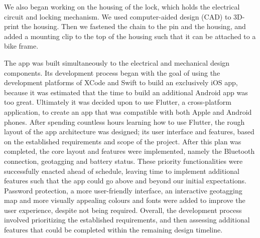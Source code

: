 \documentclass{article}
\begin{document}
We also began working on the housing of the lock, which holds the electrical circuit and locking mechanism. We used computer-aided design (CAD) to 3D-print the housing. Then we fastened the chain to the pin and the housing, and added a mounting clip to the top of the housing such that it can be attached to a bike frame. 

The app was built simultaneously to the electrical and mechanical design components. Its development process began with the goal of using the development platforms of XCode and Swift to build an exclusively iOS app, because it was estimated that the time to build an additional Android app was too great. Ultimately it was decided upon to use Flutter, a cross-platform application, to create an app that was compatible with both Apple and Android phones.  After spending countless hours learning how to use Flutter, the rough layout of the app architecture was designed; its user interface and features, based on the established requirements and scope of the project. After this plan was completed, the core layout and features were implemented, namely the Bluetooth connection, geotagging and battery status. These priority functionalities were successfully enacted ahead of schedule, leaving time to implement additional features such that the app could go above and beyond our initial expectations. Password protection, a more user-friendly interface, an interactive geotagging map and more visually appealing colours and fonts were added to improve the user experience, despite not being required. Overall, the development process involved prioritizing the established requirements, and then assessing additional features that could be completed within the remaining design timeline.
\end{document}
